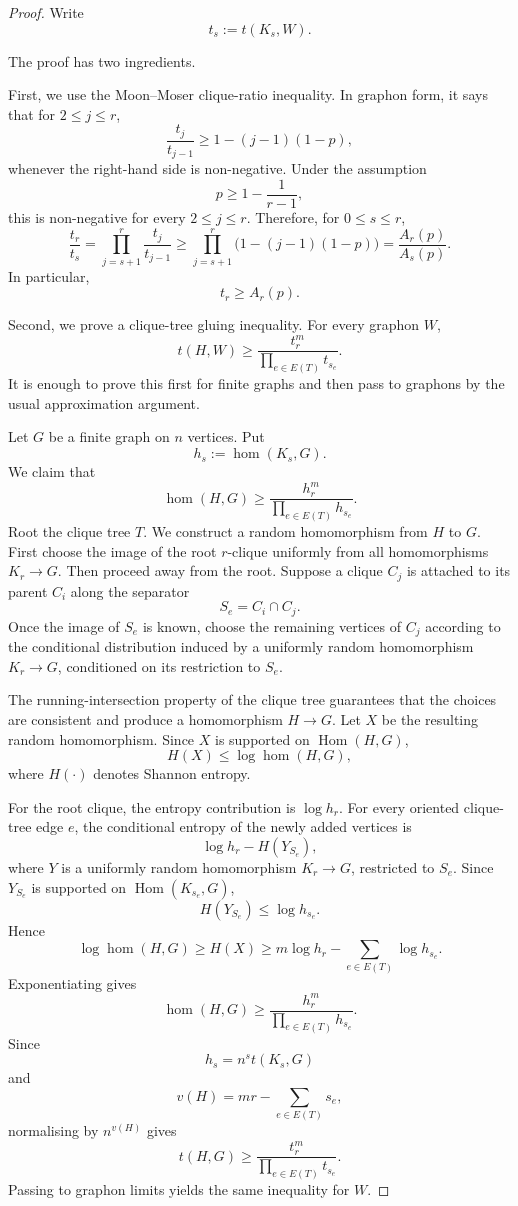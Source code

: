 \documentclass[11pt]{article}
\DeclareMathOperator{\Hom}{Hom}
\newcommand{\K}{K}
\begin{document}
\begin{proof}
Write
\[
t_s:=t(\K_s,W).
\]

The proof has two ingredients.

First, we use the Moon--Moser clique-ratio inequality. In graphon form, it says
that for \(2\le j\le r\),
\[
\frac{t_j}{t_{j-1}}
\ge
1-(j-1)(1-p),
\]
whenever the right-hand side is non-negative. Under the assumption
\[
p\ge 1-\frac1{r-1},
\]
this is non-negative for every \(2\le j\le r\). Therefore, for \(0\le s\le r\),
\[
\frac{t_r}{t_s}
=
\prod_{j=s+1}^{r}\frac{t_j}{t_{j-1}}
\ge
\prod_{j=s+1}^{r}\bigl(1-(j-1)(1-p)\bigr)
=
\frac{A_r(p)}{A_s(p)}.
\]
In particular,
\[
t_r\ge A_r(p).
\]

Second, we prove a clique-tree gluing inequality. For every graphon \(W\),
\[
t(H,W)
\ge
\frac{t_r^m}{\prod_{e\in E(T)}t_{s_e}}.
\]
It is enough to prove this first for finite graphs and then pass to graphons by
the usual approximation argument.

Let \(G\) be a finite graph on \(n\) vertices. Put
\[
h_s:=\hom(\K_s,G).
\]
We claim that
\[
\hom(H,G)
\ge
\frac{h_r^m}{\prod_{e\in E(T)}h_{s_e}}.
\]
Root the clique tree \(T\). We construct a random homomorphism from \(H\) to
\(G\). First choose the image of the root \(r\)-clique uniformly from all
homomorphisms \(\K_r\to G\). Then proceed away from the root. Suppose a clique
\(C_j\) is attached to its parent \(C_i\) along the separator
\[
S_e=C_i\cap C_j.
\]
Once the image of \(S_e\) is known, choose the remaining vertices of \(C_j\)
according to the conditional distribution induced by a uniformly random
homomorphism \(\K_r\to G\), conditioned on its restriction to \(S_e\).

The running-intersection property of the clique tree guarantees that the choices
are consistent and produce a homomorphism \(H\to G\). Let \(X\) be the resulting
random homomorphism. Since \(X\) is supported on \(\Hom(H,G)\),
\[
H(X)\le \log \hom(H,G),
\]
where \(H(\cdot)\) denotes Shannon entropy.

For the root clique, the entropy contribution is \(\log h_r\). For every
oriented clique-tree edge \(e\), the conditional entropy of the newly added
vertices is
\[
\log h_r - H(Y_{S_e}),
\]
where \(Y\) is a uniformly random homomorphism \(\K_r\to G\), restricted to
\(S_e\). Since \(Y_{S_e}\) is supported on \(\Hom(\K_{s_e},G)\),
\[
H(Y_{S_e})\le \log h_{s_e}.
\]
Hence
\[
\log \hom(H,G)
\ge
H(X)
\ge
m\log h_r-\sum_{e\in E(T)}\log h_{s_e}.
\]
Exponentiating gives
\[
\hom(H,G)
\ge
\frac{h_r^m}{\prod_{e\in E(T)}h_{s_e}}.
\]
Since
\[
h_s=n^s t(\K_s,G)
\]
and
\[
v(H)=mr-\sum_{e\in E(T)}s_e,
\]
normalising by \(n^{v(H)}\) gives
\[
t(H,G)
\ge
\frac{t_r^m}{\prod_{e\in E(T)}t_{s_e}}.
\]
Passing to graphon limits yields the same inequality for \(W\).


\end{proof}
\end{document}
